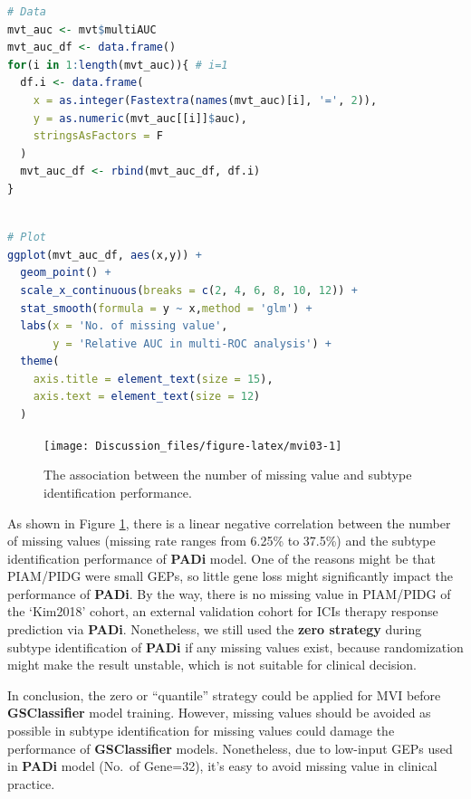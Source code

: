 \documentclass[
  12pt,
]{book}
\begin{document}
\begin{lstlisting}[language=R]
# Data
mvt_auc <- mvt$multiAUC
mvt_auc_df <- data.frame()
for(i in 1:length(mvt_auc)){ # i=1
  df.i <- data.frame(
    x = as.integer(Fastextra(names(mvt_auc)[i], '=', 2)),
    y = as.numeric(mvt_auc[[i]]$auc),
    stringsAsFactors = F
  )
  mvt_auc_df <- rbind(mvt_auc_df, df.i)
}
  
\end{lstlisting}

\begin{lstlisting}[language=R]
# Plot
ggplot(mvt_auc_df, aes(x,y)) +
  geom_point() +
  scale_x_continuous(breaks = c(2, 4, 6, 8, 10, 12)) + 
  stat_smooth(formula = y ~ x,method = 'glm') +
  labs(x = 'No. of missing value', 
       y = 'Relative AUC in multi-ROC analysis') +
  theme(
    axis.title = element_text(size = 15),
    axis.text = element_text(size = 12)
  )
\end{lstlisting}

\begin{figure}

{\centering \texttt{[image: Discussion\_files/figure-latex/mvi03-1]} 

}

\caption{The association between the number of missing value and subtype identification performance.}\label{fig:mvi03}
\end{figure}

As shown in Figure \ref{fig:mvi03}, there is a linear negative correlation between the number of missing values (missing rate ranges from 6.25\% to 37.5\%) and the subtype identification performance of \textbf{PADi} model. One of the reasons might be that PIAM/PIDG were small GEPs, so little gene loss might significantly impact the performance of \textbf{PADi}. By the way, there is no missing value in PIAM/PIDG of the `Kim2018' cohort, an external validation cohort for ICIs therapy response prediction via \textbf{PADi}. Nonetheless, we still used the \textbf{zero strategy} during subtype identification of \textbf{PADi} if any missing values exist, because randomization might make the result unstable, which is not suitable for clinical decision.

In conclusion, the zero or ``quantile'' strategy could be applied for MVI before \textbf{GSClassifier} model training. However, missing values should be avoided as possible in subtype identification for missing values could damage the performance of \textbf{GSClassifier} models. Nonetheless, due to low-input GEPs used in \textbf{PADi} model (No.~of Gene=32), it's easy to avoid missing value in clinical practice.
\end{document}
